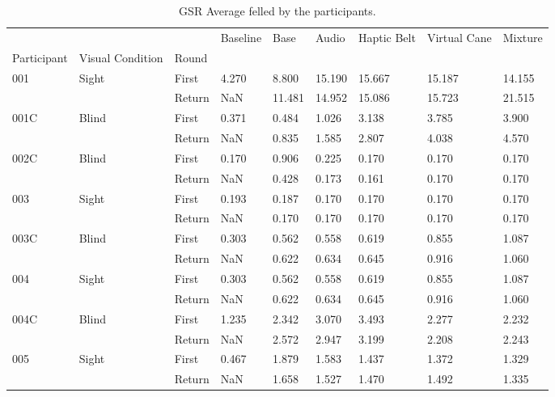 
\begin{table}[!htb]
\centering
\caption{GSR Average felled by the participants.}
\label{tab:gsr_table}
\begin{tabular}{lllllllll}
\toprule
    &       &        & Baseline &   Base &  Audio & Haptic Belt & Virtual Cane & Mixture \\
Participant & Visual Condition & Round &          &        &        &             &              &         \\
\midrule
001 & Sight & First &    4.270 &  8.800 & 15.190 &      15.667 &       15.187 &  14.155 \\
    &       & Return &      NaN & 11.481 & 14.952 &      15.086 &       15.723 &  21.515 \\
001C & Blind & First &    0.371 &  0.484 &  1.026 &       3.138 &        3.785 &   3.900 \\
    &       & Return &      NaN &  0.835 &  1.585 &       2.807 &        4.038 &   4.570 \\
002C & Blind & First &    0.170 &  0.906 &  0.225 &       0.170 &        0.170 &   0.170 \\
    &       & Return &      NaN &  0.428 &  0.173 &       0.161 &        0.170 &   0.170 \\
003 & Sight & First &    0.193 &  0.187 &  0.170 &       0.170 &        0.170 &   0.170 \\
    &       & Return &      NaN &  0.170 &  0.170 &       0.170 &        0.170 &   0.170 \\
003C & Blind & First &    0.303 &  0.562 &  0.558 &       0.619 &        0.855 &   1.087 \\
    &       & Return &      NaN &  0.622 &  0.634 &       0.645 &        0.916 &   1.060 \\
004 & Sight & First &    0.303 &  0.562 &  0.558 &       0.619 &        0.855 &   1.087 \\
    &       & Return &      NaN &  0.622 &  0.634 &       0.645 &        0.916 &   1.060 \\
004C & Blind & First &    1.235 &  2.342 &  3.070 &       3.493 &        2.277 &   2.232 \\
    &       & Return &      NaN &  2.572 &  2.947 &       3.199 &        2.208 &   2.243 \\
005 & Sight & First &    0.467 &  1.879 &  1.583 &       1.437 &        1.372 &   1.329 \\
    &       & Return &      NaN &  1.658 &  1.527 &       1.470 &        1.492 &   1.335 \\
\bottomrule
\end{tabular}
\end{table}

